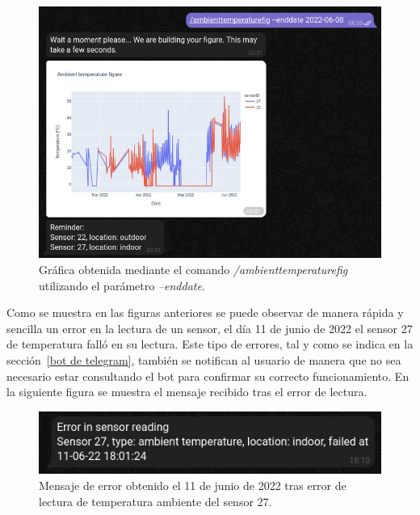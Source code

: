 \documentclass[a4paper, 12pt, oneside]{book}
\begin{document}
\begin{figure}[H]
	\centering
    \includegraphics[width=12cm, keepaspectratio]{img/ambienttemperaturefig_enddate}
    \caption{Gráfica obtenida mediante el comando \textit{/ambienttemperaturefig} utilizando el parámetro \textit{--enddate}.}
    \label{figura:ambienttemperaturefig_enddate}
\end{figure}

Como se muestra en las figuras anteriores se puede observar de manera rápida y sencilla un error en la lectura de un sensor, el día 11 de junio de 2022 el sensor 27 de temperatura falló en su lectura. 
Este tipo de errores, tal y como se indica en la sección~\ref{bot de telegram}, también se notifican al usuario de manera que no sea necesario estar consultando el bot para confirmar su correcto funcionamiento. En la siguiente figura se muestra el mensaje recibido tras el error de lectura.
\begin{figure}[H]
	\centering
    \includegraphics[width=12cm, keepaspectratio]{img/error_sensor_11_junio}
    \caption{Mensaje de error obtenido el 11 de junio de 2022 tras error de lectura de temperatura ambiente del sensor 27.}
    \label{figura:error_sensor_11_junio}
\end{figure}
\end{document}
